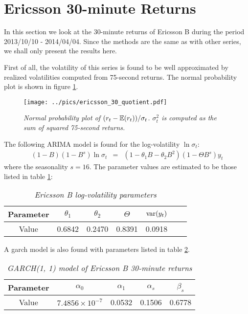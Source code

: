 \section{Ericsson 30-minute Returns}\label{sec:ericsson_30min}
In this section we look at the 30-minute returns of Ericsson B during
the period 2013/10/10 - 2014/04/04. Since the methods are the same as
with other series, we shall only present the results here.

First of all, the volatility of this series is found to be well
approximated by realized volatilities computed from 75-second
returns. The normal probability plot is shown in figure
\ref{fig:ericsson_30_quotient}.
\begin{figure}[htb!]
  \centering
  \texttt{[image: ../pics/ericsson\_30\_quotient.pdf]}
  \caption{\small \it Normal probability plot of $(r_t -\mathbb{E}(r_t))/
    \sigma_t$. $\sigma_t^2$ is computed as the sum of squared
    75-second returns.}
  \label{fig:ericsson_30_quotient}
\end{figure}
The following ARIMA model is found for the log-volatility $\ln
\sigma_t$:
\begin{eqnarray*}
  (1-B)(1-B^s) \ln\sigma_t &=& (1- \theta_1B - \theta_2B^2) (1 -
  \Theta B^s) y_t 
\end{eqnarray*}
where the seasonality $s = 16$. The parameter values are estimated to
be those listed in table
\ref{tab:ericsson_30_params}:
\begin{table}[htb!]
  \centering
  \begin{tabular}{|c|c|c|c|c|c|c|}
    \hline
    Parameter & $\theta_1$ & $\theta_2$ & $\Theta$ &
    $\text{var}(y_t)$ \\
    \hline
    Value & 0.6842 & 0.2470 & 0.8391 & 0.0918 \\
    \hline
  \end{tabular}
  \caption{\small \it Ericsson B log-volatility parameters}
  \label{tab:ericsson_30_params}
\end{table}
A \gls{garch} model is also found with parameters listed in table
\ref{tab:ericsson_30_garch_params}.
\begin{table}[htb!]
  \centering
  \begin{tabular}{|c|c|c|c|c|}
    \hline
    Parameter & $\alpha_0$ & $\alpha_1$ & $\alpha_{s}$ & $\beta_{s}$ \\
    \hline
    Value & $7.4856 \times 10^{-7}$ & 0.0532 & 0.1506 & 0.6778 \\
    \hline
  \end{tabular}
  \caption{\small \it GARCH(1, 1) model of Ericsson B 30-minute
    returns}
  \label{tab:ericsson_30_garch_params}
\end{table}

